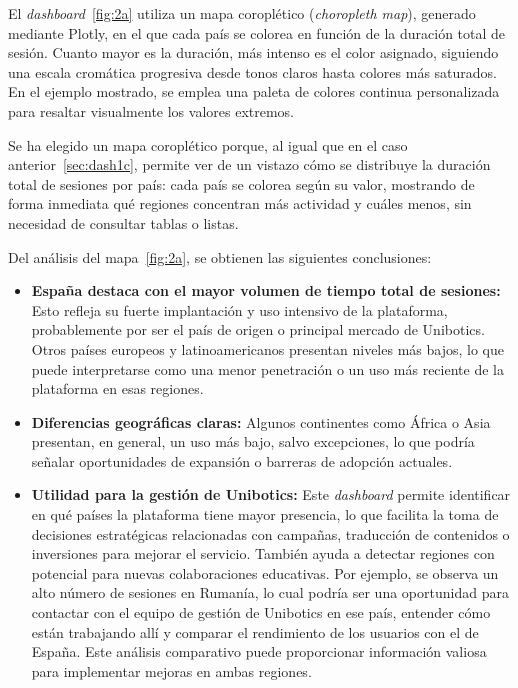 \documentclass[a4paper, 12pt]{book}
\begin{document}
El \textit{dashboard}~\ref{fig:2a} utiliza un mapa coroplético (\textit{choropleth map}), generado mediante Plotly, en el que cada país se colorea en función de la duración total de sesión. Cuanto mayor es la duración, más intenso es el color asignado, siguiendo una escala cromática progresiva desde tonos claros hasta colores más saturados. En el ejemplo mostrado, se emplea una paleta de colores continua personalizada para resaltar visualmente los valores extremos.


Se ha elegido un mapa coroplético porque, al igual que en el caso anterior~\ref{sec:dash1c}, permite ver de un vistazo cómo se distribuye la duración total de sesiones por país: cada país se colorea según su valor, mostrando de forma inmediata qué regiones concentran más actividad y cuáles menos, sin necesidad de consultar tablas o listas.

Del análisis del mapa~\ref{fig:2a}, se obtienen las siguientes conclusiones:

\begin{itemize}
  \item \textbf{España destaca con el mayor volumen de tiempo total de sesiones:} Esto refleja su fuerte implantación y uso intensivo de la plataforma, probablemente por ser el país de origen o principal mercado de Unibotics. Otros países europeos y latinoamericanos presentan niveles más bajos, lo que puede interpretarse como una menor penetración o un uso más reciente de la plataforma en esas regiones.

  \item \textbf{Diferencias geográficas claras:} Algunos continentes como África o Asia presentan, en general, un uso más bajo, salvo excepciones, lo que podría señalar oportunidades de expansión o barreras de adopción actuales.

  \item \textbf{Utilidad para la gestión de Unibotics:} Este \textit{dashboard} permite identificar en qué países la plataforma tiene mayor presencia, lo que facilita la toma de decisiones estratégicas relacionadas con campañas, traducción de contenidos o inversiones para mejorar el servicio. También ayuda a detectar regiones con potencial para nuevas colaboraciones educativas. Por ejemplo, se observa un alto número de sesiones en Rumanía, lo cual podría ser una oportunidad para contactar con el equipo de gestión de Unibotics en ese país, entender cómo están trabajando allí y comparar el rendimiento de los usuarios con el de España. Este análisis comparativo puede proporcionar información valiosa para implementar mejoras en ambas regiones.
\end{itemize}
\end{document}
